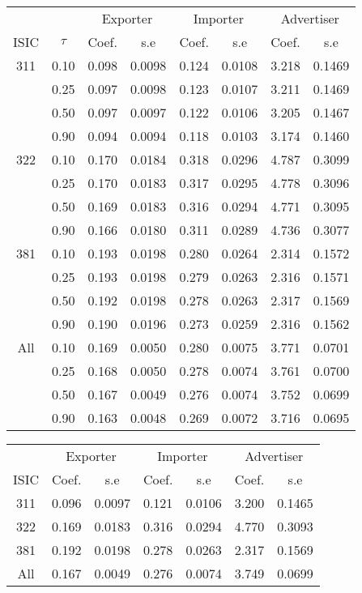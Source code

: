 \documentclass[11pt]{article}
\begin{document}
\begin{table}[H]
\centering
\begin{tabular}{cccccccc}
  \hline\hline & & \multicolumn{2}{c}{Exporter}  & \multicolumn{2}{c}{Importer} & \multicolumn{2}{c}{Advertiser} \\ \cmidrule(lr){3-4} \cmidrule(lr){5-6} \cmidrule(lr){7-8}ISIC & $\tau$ & Coef. & s.e & Coef. & s.e & Coef. & s.e \\ 
  \hline
311 & 0.10 & 0.098 & 0.0098 & 0.124 & 0.0108 & 3.218 & 0.1469 \\ 
   & 0.25 & 0.097 & 0.0098 & 0.123 & 0.0107 & 3.211 & 0.1469 \\ 
   & 0.50 & 0.097 & 0.0097 & 0.122 & 0.0106 & 3.205 & 0.1467 \\ 
   & 0.90 & 0.094 & 0.0094 & 0.118 & 0.0103 & 3.174 & 0.1460 \\ 
  322 & 0.10 & 0.170 & 0.0184 & 0.318 & 0.0296 & 4.787 & 0.3099 \\ 
   & 0.25 & 0.170 & 0.0183 & 0.317 & 0.0295 & 4.778 & 0.3096 \\ 
   & 0.50 & 0.169 & 0.0183 & 0.316 & 0.0294 & 4.771 & 0.3095 \\ 
   & 0.90 & 0.166 & 0.0180 & 0.311 & 0.0289 & 4.736 & 0.3077 \\ 
  381 & 0.10 & 0.193 & 0.0198 & 0.280 & 0.0264 & 2.314 & 0.1572 \\ 
   & 0.25 & 0.193 & 0.0198 & 0.279 & 0.0263 & 2.316 & 0.1571 \\ 
   & 0.50 & 0.192 & 0.0198 & 0.278 & 0.0263 & 2.317 & 0.1569 \\ 
   & 0.90 & 0.190 & 0.0196 & 0.273 & 0.0259 & 2.316 & 0.1562 \\ 
  All & 0.10 & 0.169 & 0.0050 & 0.280 & 0.0075 & 3.771 & 0.0701 \\ 
   & 0.25 & 0.168 & 0.0050 & 0.278 & 0.0074 & 3.761 & 0.0700 \\ 
   & 0.50 & 0.167 & 0.0049 & 0.276 & 0.0074 & 3.752 & 0.0699 \\ 
   & 0.90 & 0.163 & 0.0048 & 0.269 & 0.0072 & 3.716 & 0.0695 \\ 
   \hline
\end{tabular}
\end{table}

\begin{table}[H]
\centering
\begin{tabular}{ccccccc}
  \hline\hline & \multicolumn{2}{c}{Exporter}  & \multicolumn{2}{c}{Importer} & \multicolumn{2}{c}{Advertiser} \\ \cmidrule(lr){2-3} \cmidrule(lr){4-5} \cmidrule(lr){6-7}ISIC & Coef. & s.e & Coef. & s.e & Coef. & s.e \\ 
  \hline
311 & 0.096 & 0.0097 & 0.121 & 0.0106 & 3.200 & 0.1465 \\ 
  322 & 0.169 & 0.0183 & 0.316 & 0.0294 & 4.770 & 0.3093 \\ 
  381 & 0.192 & 0.0198 & 0.278 & 0.0263 & 2.317 & 0.1569 \\ 
  All & 0.167 & 0.0049 & 0.276 & 0.0074 & 3.749 & 0.0699 \\ 
   \hline
\end{tabular}
\end{table}
\end{document}
